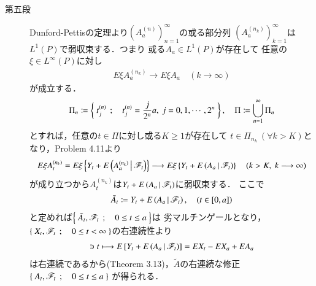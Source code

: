 \begin{prf}
\begin{description}
			\item[第五段]
				Dunford-Pettisの定理より$\left( A^{(n)}_a \right)_{n=1}^\infty$の或る部分列
				$\left( A^{(n_k)}_a \right)_{k=1}^\infty$は$L^1(P)$で弱収束する．つまり
				或る$A_a \in L^1(P)$が存在して
				任意の$\xi \in L^\infty(P)$に対し
				\begin{align}
					E \xi A^{(n_k)}_a \longrightarrow E \xi A_a
					\quad (k \longrightarrow \infty)
				\end{align}
				が成立する．
				\begin{align}
					\Pi_n \coloneqq \left\{\ t^{(n)}_j\ \, ; \quad t^{(n)}_j = \frac{j}{2^n}a,\ j=0,1,\cdots,2^n\ \right\},
					\quad \Pi \coloneqq \bigcup_{n=1}^\infty \Pi_n
				\end{align}
				とすれば，任意の$t \in \Pi$に対し或る$K \geq 1$が存在して
				$t \in \Pi_{n_k}\ (\forall k > K)$となり，Problem 4.11より
				\begin{align}
					E \xi A^{(n_k)}_t
					= E \xi\left\{ Y_t + E\left( A^{(n_k)}_a \, \middle|\, \mathscr{F}_t \right) \right\}
					\longrightarrow E \xi\left\{ Y_t + E\left( A_a \, \middle|\, \mathscr{F}_t \right) \right\}
					\quad (k > K,\ k \longrightarrow \infty)
				\end{align}
				が成り立つから$A^{(n_k)}_t$は$Y_t + E\left( A_a \, \middle|\, \mathscr{F}_t \right)$に弱収束する．
				ここで
				\begin{align}
					\tilde{A}_t \coloneqq Y_t + E\left( A_a \, \middle|\, \mathscr{F}_t \right),
					\quad (t \in [0,a])
				\end{align}
				と定めれば$\left\{\ \tilde{A}_t,\mathscr{F}_t\ \, ; \quad 0 \leq t \leq a\ \right\}$は
				劣マルチンゲールとなり，$\left\{\ X_t,\mathscr{F}_t\ \, ; \quad 0 \leq t <\infty\ \right\}$の右連続性より
				\begin{align}
					[0,a] \ni t \longmapsto E\left[ Y_t + \cexp{A_a}{\mathscr{F}_t} \right]
					= E X_t - E X_a + E A_a
				\end{align}
				は右連続であるから(Theorem 3.13)，$\tilde{A}$の右連続な修正$\left\{\ A_t,\mathscr{F}_t\ \, ; \quad 0 \leq t \leq a\ \right\}$
				が得られる．
			

\end{description}
\end{prf}

